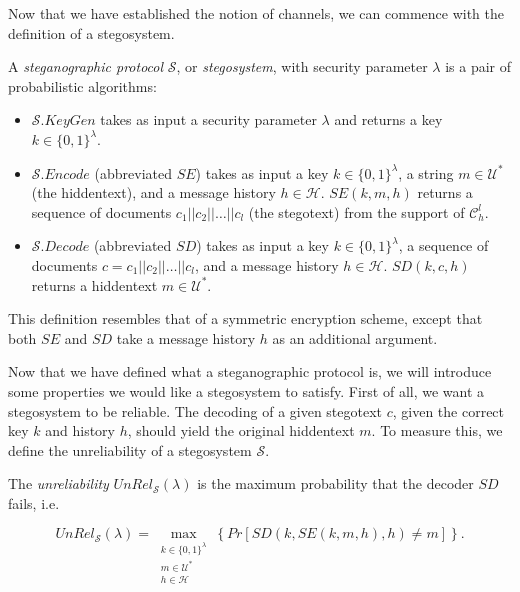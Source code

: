 Now that we have established the notion of channels, we can commence with the definition of a stegosystem.
\begin{definition}
\label{def:stegosystem}
A \emph{steganographic protocol} $\mathcal{S}$, or \emph{stegosystem}, with security parameter $\lambda$ is a pair of probabilistic algorithms:

\begin{itemize}
  \item $\mathcal{S}.KeyGen$ takes as input a security parameter $\lambda$ and returns a key $k \in \{0,1\}^\lambda$.
  \item $\mathcal{S}.Encode$ (abbreviated $SE$) takes as input a key $k \in \{0,1\}^\lambda$, a string $m \in \mathcal{U}^*$ (the hiddentext), and a message history $h \in \mathcal{H}$.
    $SE(k, m, h)$ returns a sequence of documents $c_1||c_2||\dots||c_l$ (the stegotext) from the support of $\mathcal{C}_h^l$.
  \item $\mathcal{S}.Decode$ (abbreviated $SD$) takes as input a key $k \in \{0,1\}^\lambda$, a sequence of documents $c = c_1||c_2||\dots||c_l$, and a message history $h \in \mathcal{H}$.
    $SD(k, c, h)$ returns a hiddentext $m \in \mathcal{U}^*$.
\end{itemize}
\end{definition}

This definition resembles that of a symmetric encryption scheme, except that both $SE$ and $SD$ take a message history $h$ as an additional argument.

Now that we have defined what a steganographic protocol is, we will introduce some properties we would like a stegosystem to satisfy.
First of all, we want a stegosystem to be reliable.
The decoding of a given stegotext $c$, given the correct key $k$ and history $h$, should yield the original hiddentext $m$.
To measure this, we define the unreliability of a stegosystem $\mathcal{S}$.

\begin{definition}
\label{def:unreliability}
The \emph{unreliability} $UnRel_{\mathcal{S}}(\lambda)$ is the maximum probability that the decoder $SD$ fails, i.e.	

$$UnRel_{\mathcal{S}}(\lambda) = \max_{\substack{k \in \{0,1\}^\lambda\\m \in \mathcal{U}^*\\ h \in \mathcal{H}}}\left\{ Pr[SD(k, SE(k,m,h), h) \neq m] \right\}.$$
\end{definition}

